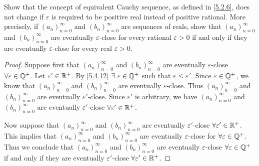 \begin{ex}\label{ex:6.1.10}
  Show that the concept of equivalent Cauchy sequence, as defined in \cref{5.2.6}, does not change if \(\varepsilon\) is required to be positive real instead of positive rational.
  More precisely, if \((a_n)_{n = 0}^\infty\) and \((b_n)_{n = 0}^\infty\) are sequences of reals, show that \((a_n)_{n = 0}^\infty\) and \((b_n)_{n = 0}^\infty\) are eventually \(\varepsilon\)-close for every rational \(\varepsilon > 0\) if and only if they are eventually \(\varepsilon\)-close for every real \(\varepsilon > 0\).
\end{ex}

\begin{proof}
  Suppose first that \((a_n)_{n = 0}^\infty\) and \((b_n)_{n = 0}^\infty\) are eventually \(\varepsilon\)-close \(\forall \varepsilon \in \mathbb{Q}^+\).
  Let \(\varepsilon' \in \mathbb{R}^+\).
  By \cref{5.4.12} \(\exists\ \varepsilon \in \Q^+\) such that \(\varepsilon \leq \varepsilon'\).
  Since \(\varepsilon \in \mathbb{Q}^+\), we know that \((a_n)_{n = 0}^\infty\) and \((b_n)_{n = 0}^\infty\) are eventually \(\varepsilon\)-close.
  Thus \((a_n)_{n = 0}^\infty\) and \((b_n)_{n = 0}^\infty\) are eventually \(\varepsilon'\)-close.
  Since \(\varepsilon'\) is arbitrary, we have \((a_n)_{n = 0}^\infty\) and \((b_n)_{n = 0}^\infty\) are eventually \(\varepsilon'\)-close \(\forall \varepsilon' \in \mathbb{R}^+\).

  Now suppose that \((a_n)_{n = 0}^\infty\) and \((b_n)_{n = 0}^\infty\) are eventually \(\varepsilon'\)-close \(\forall \varepsilon' \in \mathbb{R}^+\).
  This implies that \((a_n)_{n = 0}^\infty\) and \((b_n)_{n = 0}^\infty\) are eventually \(\varepsilon\)-close for \(\forall \varepsilon \in \mathbb{Q}^+\).
  Thus we conclude that \((a_n)_{n = 0}^\infty\) and \((b_n)_{n = 0}^\infty\) are eventually \(\varepsilon\)-close \(\forall \varepsilon \in \mathbb{Q}^+\) if and only if they are eventually \(\varepsilon'\)-close \(\forall \varepsilon' \in \mathbb{R}^+\).
\end{proof}
